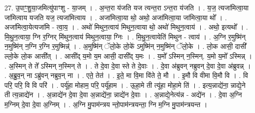 \documentclass[17pt]{extarticle}
\begin{document}
27. उ॒पाꣳ॒॒शु॒या॒जमित्यु॑पाꣳशु - या॒जम् । . अ॒न्त॒रा य॑जति यज त्यन्त॒रा ऽन्त॒रा य॑जति । . य॒ज॒ त्यजा॑मित्वा॒या जा॑मित्वाय यजति यज॒ त्यजा॑मित्वाय । . अजा॑मित्वा॒या थो॒ अथो॒ अजा॑मित्वा॒या जा॑मित्वा॒या थो᳚ । . अजा॑मित्वा॒येत्यजा॑मि - त्वा॒य॒ । . अथो॑ मिथुन॒त्वाय॑ मिथुन॒त्वाया थो॒ अथो॑ मिथुन॒त्वाय॑ । . अथो॒ इत्यथो᳚ । . मि॒थु॒न॒त्वाया॒ ग्नि र॒ग्निर् मि॑थुन॒त्वाय॑ मिथुन॒त्वाया॒ ग्निः । . मि॒थु॒न॒त्वायेति॑ मिथुन - त्वाय॑ । . अ॒ग्नि र॒मुष्मि॑न् न॒मुष्मि॑न् न॒ग्नि र॒ग्नि र॒मुष्मिन्न्॑ । . अ॒मुष्मि॑न् ॅलो॒के लो॒के॑ ऽमुष्मि॑न् न॒मुष्मि॑न् ॅलो॒के । . लो॒क आसी॒ दासी᳚ ल्लो॒के लो॒क आसी᳚त् । . आसी᳚द् य॒मो य॒म आसी॒ दासी᳚द् य॒मः । . य॒मो᳚ ऽस्मिन् न॒स्मिन्. य॒मो य॒मो᳚ ऽस्मिन्न् । . अ॒स्मिन् ते ते᳚ ऽस्मिन् न॒स्मिन् ते । . ते दे॒वा दे॒वा स्ते ते दे॒वाः । . दे॒वा अ॑ब्रुवन् नब्रुवन् दे॒वा दे॒वा अ॑ब्रुवन्न् । . अ॒ब्रु॒व॒न् ना ऽब्रु॑वन् नब्रुव॒न् ना । . एते॒ तेत॑ । . इ॒ते॒ मा वि॒मा वि॑ते ते॒ मौ । . इ॒मौ वि वीमा वि॒मौ वि । . वि परि॒ परि॒ वि वि परि॑ । . पर्यू॑हा मोहाम॒ परि॒ पर्यू॑हाम । . ऊ॒हा॒मे ती त्यू॑हा मोहा॒मे ति॑ । . इत्य॒न्नाद्ये॑ना॒ न्नाद्ये॒ने ती त्य॒न्नाद्ये॑न । . अ॒न्नाद्ये॑न दे॒वा दे॒वा अ॒न्नाद्ये॑ना॒ न्नाद्ये॑न दे॒वाः । . अ॒न्नाद्ये॒नेत्य॑न्न - अद्ये॑न । . दे॒वा अ॒ग्नि म॒ग्निम् दे॒वा दे॒वा अ॒ग्निम् । . अ॒ग्नि मु॒पाम॑न्त्रय न्तो॒पाम॑न्त्रयन्ता॒ ग्नि म॒ग्नि मु॒पाम॑न्त्रयन्त । \newline
\end{document}

